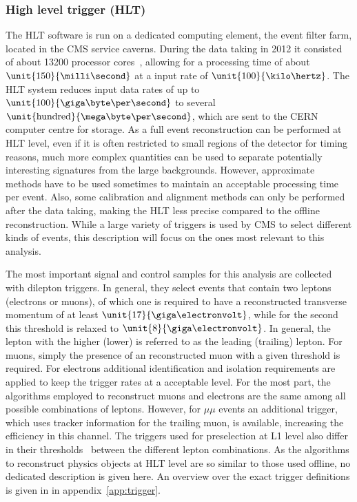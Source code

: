 \subsubsection*{High level trigger (HLT)}
The HLT software is run on a dedicated computing element, the event filter farm, located in the CMS service caverns. During the data taking in 2012 it consisted of about 13200 processor cores~\cite{HLTProceedings}, allowing for a processing time of about $\unit{150}{\milli\second}$ at a input rate of $\unit{100}{\kilo\hertz}$. The HLT system reduces input data rates of up to $\unit{100}{\giga\byte\per\second}$ to several $\unit{\text{hundred}}{\mega\byte\per\second}$, which are sent to the CERN computer centre for storage. As a full event reconstruction can be performed at HLT level, even if it is often restricted to small regions of the detector for timing reasons, much more complex quantities can be used to separate potentially interesting signatures from the large backgrounds. However, approximate methods have to be used sometimes to maintain an acceptable processing time per event. Also, some calibration and alignment methods can only be performed after the data taking, making the HLT less precise compared to the offline reconstruction. While a large variety of triggers is used by CMS to select different kinds of events, this description will focus on the ones most relevant to this analysis. 

The most important signal and control samples for this analysis are collected with dilepton triggers. In general, they select events that contain two leptons (electrons or muons), of which one is required to have a reconstructed transverse momentum \pt of at least $\unit{17}{\giga\electronvolt}$, while for the second this threshold is relaxed to $\unit{8}{\giga\electronvolt}$. In general, the lepton with the higher (lower) \pt is referred to as the leading (trailing) lepton.  For muons, simply the presence of an reconstructed muon with a given \pt threshold is required. For electrons additional identification and isolation requirements are applied to keep the trigger rates at a acceptable level. For the most part, the algorithms employed to reconstruct muons and electrons are the same among all possible combinations of leptons. However, for $\mu\mu$ events an additional trigger, which uses tracker information for the trailing muon, is available, increasing the efficiency in this channel. The triggers used for preselection at L1 level also differ in their thresholds~\cite{HLTConfigBrowser} between the different lepton combinations. As the algorithms to reconstruct physics objects at HLT level are so similar to those used offline, no dedicated description is given here. An overview over the exact trigger definitions is given in in appendix~\ref{app:trigger}.

